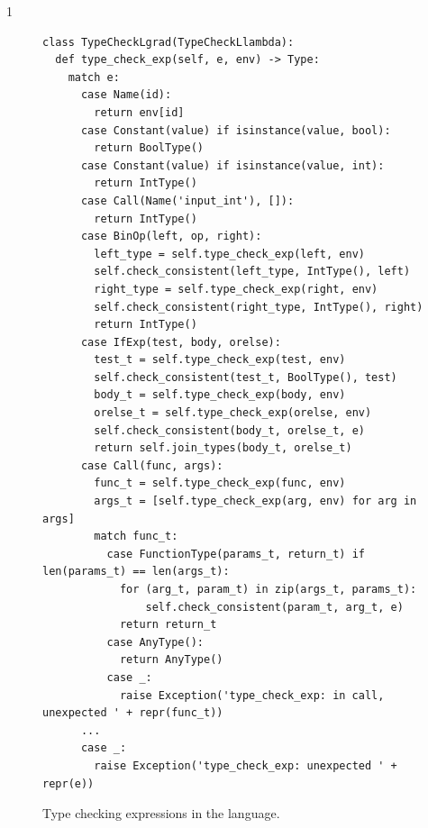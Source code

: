 \documentclass[7x10]{TimesAPriori_MIT}%
\def\pythonEd{1}
\def\edition{0}
\numberwithin{theorem}{chapter}
\numberwithin{definition}{chapter}
\numberwithin{equation}{chapter}
\begin{document}
{\if\edition\pythonEd        
\begin{figure}[tbp]
\begin{tcolorbox}[colback=white]  
\begin{lstlisting}[basicstyle=\ttfamily\footnotesize]
class TypeCheckLgrad(TypeCheckLlambda):
  def type_check_exp(self, e, env) -> Type:
    match e:
      case Name(id):
        return env[id]
      case Constant(value) if isinstance(value, bool):
        return BoolType()
      case Constant(value) if isinstance(value, int):
        return IntType()
      case Call(Name('input_int'), []):
        return IntType()
      case BinOp(left, op, right):
        left_type = self.type_check_exp(left, env)
        self.check_consistent(left_type, IntType(), left)
        right_type = self.type_check_exp(right, env)
        self.check_consistent(right_type, IntType(), right)
        return IntType()
      case IfExp(test, body, orelse):
        test_t = self.type_check_exp(test, env)
        self.check_consistent(test_t, BoolType(), test)
        body_t = self.type_check_exp(body, env)
        orelse_t = self.type_check_exp(orelse, env)
        self.check_consistent(body_t, orelse_t, e)
        return self.join_types(body_t, orelse_t)
      case Call(func, args):
        func_t = self.type_check_exp(func, env)
        args_t = [self.type_check_exp(arg, env) for arg in args]
        match func_t:
          case FunctionType(params_t, return_t) if len(params_t) == len(args_t):
            for (arg_t, param_t) in zip(args_t, params_t):
                self.check_consistent(param_t, arg_t, e)
            return return_t
          case AnyType():
            return AnyType()
          case _:
            raise Exception('type_check_exp: in call, unexpected ' + repr(func_t))
      ...
      case _:
        raise Exception('type_check_exp: unexpected ' + repr(e))
\end{lstlisting}
\end{tcolorbox}

\caption{Type checking expressions in the \LangGrad{} language.}
\label{fig:type-check-Lgradual-1}
\end{figure}

}
\end{document}
